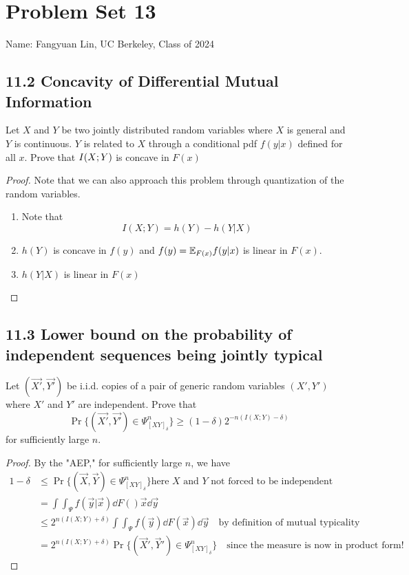 \documentclass[../main.tex]{subfiles}
\begin{document}
\section*{Problem Set 13}
    Name: Fangyuan Lin, UC Berkeley, Class of 2024

\subsection*{11.2 Concavity of Differential Mutual Information}
Let $X$ and $Y$ be two jointly distributed random variables where $X$ is general and $Y$ is continuous. $Y$ is related to $X$ through a conditional pdf $f(y|x)$ defined for all $x$. Prove that $I(X;Y)$ is concave in $F(x)$
\begin{proof}
    Note that we can also approach this problem through quantization of the random variables.
    \begin{enumerate}
        \item Note that \[
        I(X;Y) = h(Y)-h(Y|X)
        \]
        \item $h(Y)$ is concave in $f(y)$ and $f(y)=\mathbb{E}_{F(x)}f(y|x)$ is linear in $F(x)$.
        \item $h(Y|X)$ is linear in $F(x)$
    \end{enumerate}
\end{proof}
\subsection*{11.3 Lower bound on the probability of independent sequences being jointly typical}
    Let $(\vec{X'},\vec{Y'})$ be i.i.d. copies of a pair of generic random variables $(X',Y')$ where $X'$ and $Y'$ are independent. Prove that \[
    \Pr\{(\vec{X'},\vec{Y'})\in\Psi^n_{[XY]_\delta}\} \geq (1-\delta)2^{-n(I(X;Y)-\delta)}
    \] for sufficiently large $n$.
\begin{proof}
    By the "AEP," for sufficiently large $n$, we have \begin{align*}
        1-\delta &\leq \Pr\{(\vec X,\vec Y)\in \Psi^n_{[XY]_\delta}\} \text{here $X$ and $Y$ not forced to be independent}\\
        &=\int\int_{\Psi}f(\vec y|\vec x)\dd F()\vec x\dd \vec y \\
        &\leq 2^{n(I(X;Y)+\delta)}\int\int_\Psi f(\vec y)\dd F(\vec x)\dd \vec y \quad \text{by definition of mutual typicality}\\
        &=  2^{n(I(X;Y)+\delta)} \Pr\{(\vec X',\vec Y')\in \Psi^n_{[XY]_\delta}\} \quad\text{since the measure is now in product form!}
    \end{align*}
\end{proof}
\end{document}
